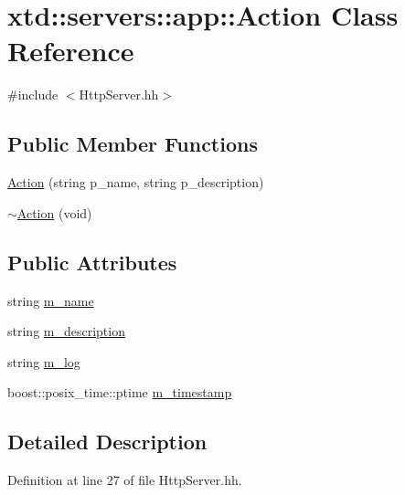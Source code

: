 \hypertarget{classxtd_1_1servers_1_1app_1_1Action}{\section{xtd\-:\-:servers\-:\-:app\-:\-:Action Class Reference}
\label{classxtd_1_1servers_1_1app_1_1Action}
}


{\ttfamily \#include $<$Http\-Server.\-hh$>$}

\subsection*{Public Member Functions}
\begin{DoxyCompactItemize}
\item 
\hyperlink{classxtd_1_1servers_1_1app_1_1Action_aea5ec95c3aa4f39ac164507a0684b6c2}{Action} (string p\-\_\-name, string p\-\_\-description)
\item 
\hyperlink{classxtd_1_1servers_1_1app_1_1Action_a0859f1ac8244776126115daf388985af}{$\sim$\-Action} (void)
\end{DoxyCompactItemize}
\subsection*{Public Attributes}
\begin{DoxyCompactItemize}
\item 
string \hyperlink{classxtd_1_1servers_1_1app_1_1Action_a397748b5fd8412efcf779978ed4f4eef}{m\-\_\-name}
\item 
string \hyperlink{classxtd_1_1servers_1_1app_1_1Action_a78d15b580f1f537cc273f05500a823e8}{m\-\_\-description}
\item 
string \hyperlink{classxtd_1_1servers_1_1app_1_1Action_a8ac7e4975e2fde1bb9237454bd99faec}{m\-\_\-log}
\item 
boost\-::posix\-\_\-time\-::ptime \hyperlink{classxtd_1_1servers_1_1app_1_1Action_a3baf29675a2f46cf5946816cf6c9b7b6}{m\-\_\-timestamp}
\end{DoxyCompactItemize}


\subsection{Detailed Description}


Definition at line 27 of file Http\-Server.\-hh.



